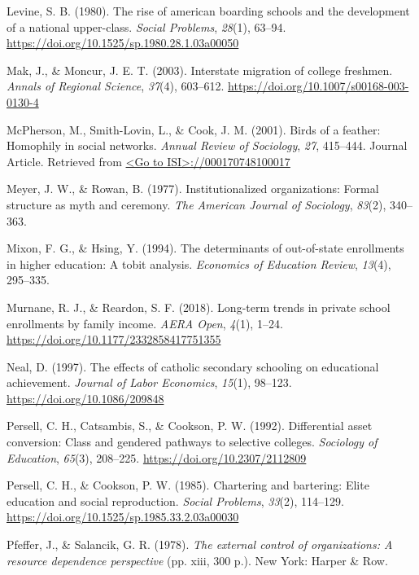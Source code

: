 \documentclass[
  12pt,
]{article}
\newlength{\cslhangindent}
\newenvironment{CSLReferences}[2] %
 {\begin{list}{}{%
  \setlength{\itemindent}{0pt}
  \setlength{\leftmargin}{0pt}
  \setlength{\parsep}{0pt}
  \ifodd #1
   \setlength{\leftmargin}{\cslhangindent}
   \setlength{\itemindent}{-1\cslhangindent}
  \fi
  \setlength{\itemsep}{#2\baselineskip}}}
 {\end{list}}
\begin{document}
\begin{CSLReferences}{1}{0}
Levine, S. B. (1980). The rise of american boarding schools and the development of a national upper-class. \emph{Social Problems}, \emph{28}(1), 63--94. \url{https://doi.org/10.1525/sp.1980.28.1.03a00050}

Mak, J., \& Moncur, J. E. T. (2003). Interstate migration of college freshmen. \emph{Annals of Regional Science}, \emph{37}(4), 603--612. \url{https://doi.org/10.1007/s00168-003-0130-4}

McPherson, M., Smith-Lovin, L., \& Cook, J. M. (2001). Birds of a feather: Homophily in social networks. \emph{Annual Review of Sociology}, \emph{27}, 415--444. Journal Article. Retrieved from \href{\%3CGo\%20to\%20ISI\%3E://000170748100017}{\textless Go to ISI\textgreater://000170748100017}

Meyer, J. W., \& Rowan, B. (1977). Institutionalized organizations: Formal structure as myth and ceremony. \emph{The American Journal of Sociology}, \emph{83}(2), 340--363.

Mixon, F. G., \& Hsing, Y. (1994). The determinants of out-of-state enrollments in higher education: A tobit analysis. \emph{Economics of Education Review}, \emph{13}(4), 295--335.

Murnane, R. J., \& Reardon, S. F. (2018). Long-term trends in private school enrollments by family income. \emph{AERA Open}, \emph{4}(1), 1--24. \url{https://doi.org/10.1177/2332858417751355}

Neal, D. (1997). The effects of catholic secondary schooling on educational achievement. \emph{Journal of Labor Economics}, \emph{15}(1), 98--123. \url{https://doi.org/10.1086/209848}

Persell, C. H., Catsambis, S., \& Cookson, P. W. (1992). Differential asset conversion: Class and gendered pathways to selective colleges. \emph{Sociology of Education}, \emph{65}(3), 208--225. \url{https://doi.org/10.2307/2112809}

Persell, C. H., \& Cookson, P. W. (1985). Chartering and bartering: Elite education and social reproduction. \emph{Social Problems}, \emph{33}(2), 114--129. \url{https://doi.org/10.1525/sp.1985.33.2.03a00030}

Pfeffer, J., \& Salancik, G. R. (1978). \emph{The external control of organizations: A resource dependence perspective} (pp. xiii, 300 p.). New York: Harper \& Row.


\end{CSLReferences}
\end{document}
